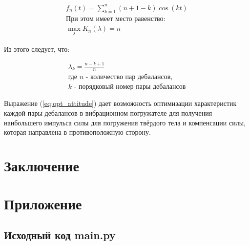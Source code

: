 
\begin{equation}\label{eq:feer}
    \begin{gathered}
        f_n(t) = \sum \limits_{k=1}^n (n+1-k) \cos(kt) \\
        \textrm{При этом имеет место равенство:} \\
        \max \limits_{\lambda} K_n(\lambda) = n
    \end{gathered}
\end{equation}

Из этого следует, что:

\begin{equation}\label{eq:opt_attitude}
    \begin{gathered}
        \lambda_k = \frac{n - k + 1}{n} \\
        \textrm{где $n$ - количество пар дебалансов,} \\
        \textrm{$k$ - порядковый номер пары дебалансов}
    \end{gathered}
\end{equation}

Выражение (\ref{eq:opt_attitude}) дает возможность оптимизации характеристик каждой пары дебалансов в вибрационном погружателе для получения наибольшего импульса силы для погружения твёрдого тела и компенсации силы, которая направлена в противоположную сторону.


\clearpage
\section{Заключение}


\clearpage
\section{Приложение}
\subsection{Исходный код main.py}
% 


\clearpage
{}
\begin{thebibliography}{}
    \bibitem{}
\end{thebibliography}
